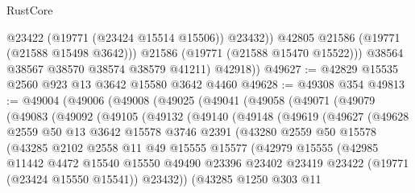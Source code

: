 \begin{lexlean}{RustCore}
\begin{coremodule}
                  @23422
                  (@19771 (@23424 @15514 @15506))
                  @23432))
              @42805
              @21586
              (@19771 (@21588 @15498 @3642)))
            @21586
            (@19771 (@21588 @15470 @15522)))
          @38564
          @38567
          @38570
          @38574
          @38579
          @41211)
        @42918))
@49627 := @42829 @15535 @2560 @923 @13 @3642 @15580 @3642 @4460
@49628 := @49308 @354
@49813 := @49004
    (@49006
      (@49008
        (@49025
          (@49041
            (@49058
              (@49071
                (@49079
                  (@49083
                    (@49092
                      (@49105
                        (@49132
                          (@49140
                            (@49148
                              (@49619
                                (@49627
                                  (@49628
                                    @2559
                                    @50
                                    @13
                                    @3642
                                    @15578
                                    @3746
                                    @2391
                                    (@43280
                                      @2559
                                      @50
                                      @15578
                                      (@43285
                                        @2102
                                        @2558
                                        @11
                                        @49
                                        @15555
                                        @15577
                                        (@42979
                                          @15555
                                          (@42985
                                            @11442
                                            @4472
                                            @15540
                                            @15550
                                            @49490
                                            @23396
                                            @23402
                                            @23419
                                            @23422
                                            (@19771 (@23424 @15550 @15541))
                                            @23432))
                                        (@43285
                                          @1250
                                          @303
                                          @11

\end{coremodule}
\end{lexlean}
